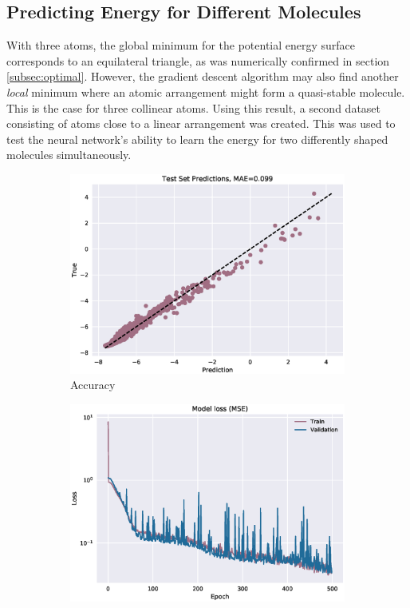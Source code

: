 \documentclass[12pt,a4paper]{article}
\begin{document}
\clearpage
\subsection{Predicting Energy for Different Molecules} %
With three atoms, the global minimum for the potential energy surface corresponds to an equilateral triangle, as was numerically confirmed in section \ref{subsec:optimal}. However, the gradient descent algorithm may also find another \emph{local} minimum where an atomic arrangement might form a quasi-stable molecule. This is the case for three collinear atoms. Using this result, a second dataset consisting of atoms close to a linear arrangement was created. This was used to test the neural network's ability to learn the energy for two differently shaped molecules simultaneously. 
\begin{figure}[!h]
\centering
\begin{subfigure}[t]{0.49\textwidth}    
    \includegraphics[width = \linewidth]{images/predictionshapes.eps}
    \caption{Accuracy}
    \label{fig:5sub1}
\end{subfigure}
\begin{subfigure}[t]{0.49\textwidth}
    \includegraphics[width = \linewidth]{images/lossshapes.eps}

\end{subfigure}
\end{figure}
\end{document}
